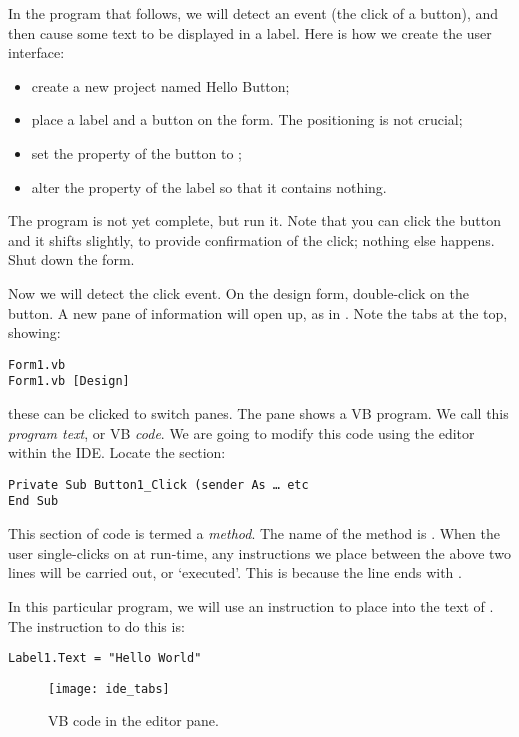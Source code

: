 		In the program that follows, we will detect an event (the click of a button), and then cause some text to be displayed in a label. Here is how we create the user interface:
		\begin{itemize}
			\item	create a new project named Hello Button;
			\item	place a label and a button on the form. The positioning is not crucial;
			\item set the  property of the button to ;
			\item alter the  property of the label so that it contains nothing.
		\end{itemize}
		The program is not yet complete, but run it. Note that you can click the button and it shifts slightly, to provide confirmation of the click; nothing else happens. Shut down the form.
		
		Now we will detect the click event. On the design form, double-click on the button. A new pane of information will open up, as in . Note the tabs at the top, showing:
		\begin{lstlisting}
Form1.vb
Form1.vb [Design]
		\end{lstlisting}
		these can be clicked to switch panes. The  pane shows a VB program. We call this \emph{program text}, or VB \emph{code}. We are going to modify this code using the editor within the IDE.
Locate the section:
		\begin{lstlisting}
Private Sub Button1_Click (sender As … etc
End Sub
		\end{lstlisting}
		This section of code is termed a \emph{method}. The name of the method is . When the user single-clicks on  at run-time, any instructions we place between the above two lines will be carried out, or ‘executed’. This is because the line ends with .
		
		In this particular program, we will use an instruction to place  into the text of . The instruction to do this is:
		\begin{lstlisting}
Label1.Text = "Hello World"
		\end{lstlisting}

		\begin{figure}[ht]
			\centering
			\texttt{[image: ide\_tabs]}
			\caption{VB code in the editor pane.}
			\label{fig:ide_tabs}
		\end{figure}

